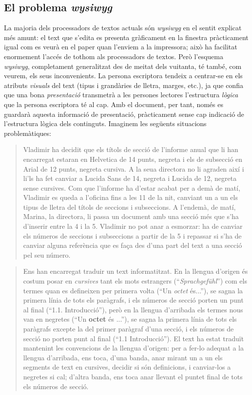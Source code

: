 \subsection{El problema \emph{wysiwyg}}\label{s3:problema_wysiwyg}
La majoria dels processadors de textos actuals són \emph{wysiwyg} en
el sentit explicat més amunt: el text que s'edita es presenta
gràficament en la finestra pràcticament igual com es veurà en el paper
quan l'enviem a la impressora; això ha facilitat enormement l'accés de
tothom als processadors de textos. Però l'esquema \emph{wysiwyg},
completament generalitzat des de meitat dels vuitanta, té també, com
veurem, els seus inconvenients.  La persona escriptora tendeix a
centrar-se en els atributs \emph{visuals} del text (tipus i grandàries
de lletra, marges, etc.), ja que confia que una bona
\emph{presentació} transmetrà a les persones lectores l'estructura
\emph{lògica} que la persona escriptora té al cap.  Amb el document,
per tant, només es guardarà aquesta informació de presentació,
pràcticament sense cap indicació de l'estructura lògica dels
continguts. Imaginem les següents situacions problemàtiques:
  \begin{quote}
    Vladimir ha decidit que els títols de secció de l'informe anual
    que li han encarregat estaran en Helvetica de 14 punts, negreta i
    els de subsecció en Arial de 12 punts, negreta cursiva. A la seua
    directora no li agraden així i li'ls ha fet canviar a Lucida Sans
    de 14, negreta i Lucida de 12, negreta sense cursives. Com que
    l'informe ha d'estar acabat per a demà de matí, Vladimir es queda
    a l'oficina fins a les 11 de la nit, canviant un a un els tipus de
    lletra del títols de seccions i subseccions. A l'endemà, de matí,
    Marina, la directora, li passa un document amb una secció més que
    s'ha d'inserir entre la 4 i la 5. Vladimir no pot anar a esmorzar:
    ha de canviar els números de seccions i subseccions a partir de la
    5 i repassar si s'ha de canviar alguna referència que es faça des
    d'una part del text a una secció pel seu número.
  \end{quote}

  \begin{quote}
    Ens han encarregat traduir un text informatitzat. En la llengua
    d'origen és costum posar en \emph{cursives} tant els mots
    estrangers (``\emph{Sprachgefühl}'') com els termes quan es
    defineixen per primera volta (``Un \emph{octet} és...''), se sagna
    la primera línia de tots els paràgrafs, i els números de secció
    porten un punt al final (``1.1. Introducció''), però en la llengua
    d'arribada els termes nous van en negretes (``Un \textbf{octet} és
    ...''), se sagna la primera línia de tots els paràgrafs excepte la
    del primer paràgraf d'una secció, i els números de secció no
    porten punt al final (``1.1 Introducció''). El text ha estat
    traduït mantenint les convencions de la llengua d'origen: per a
    fer-lo adequat a la llengua d'arribada, ens toca, d'una banda,
    anar mirant un a un els segments de text en cursives, decidir si
    són definicions, i canviar-los a negretes si cal; d'altra banda,
    ens toca anar llevant el puntet final de tots els números de
    secció.
  \end{quote}
  
